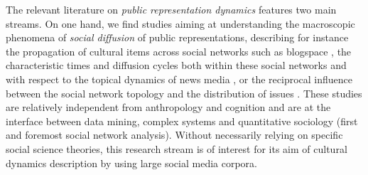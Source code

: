 The relevant literature on \emph{public representation dynamics} features two main streams. On one hand, we find studies aiming at understanding the macroscopic phenomena of \emph{social diffusion} of public representations, describing for instance the propagation of cultural items across social networks such as blogspace \citep{Gruhl04}, the characteristic times and diffusion cycles both within these social networks and with respect to the topical dynamics of news media \citep{Leskovec09}, or the reciprocal influence between the social network topology and the distribution of issues \citep{Cointet09}.     
These studies are relatively independent from anthropology and cognition and are at the interface between data mining, complex systems and quantitative sociology (first and foremost social network analysis). Without necessarily relying on specific social science theories, %
this research stream is of interest for its aim of cultural dynamics description by using large social media corpora.
 
